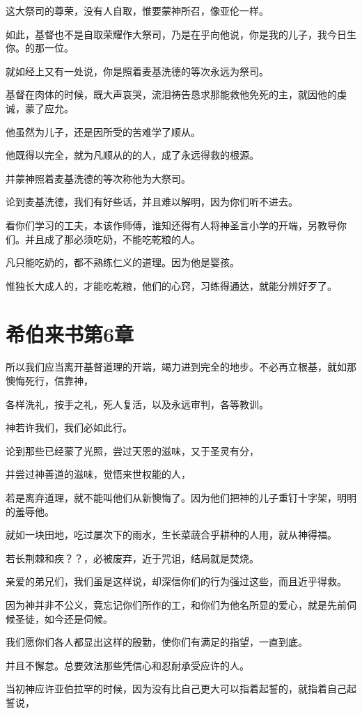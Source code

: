 \documentclass[12pt,oneside]{book}
\begin{document}
这大祭司的尊荣，没有人自取，惟要蒙神所召，像亚伦一样。

如此，基督也不是自取荣耀作大祭司，乃是在乎向他说，你是我的儿子，我今日生你。的那一位。

就如经上又有一处说，你是照着麦基洗德的等次永远为祭司。

基督在肉体的时候，既大声哀哭，流泪祷告恳求那能救他免死的主，就因他的虔诚，蒙了应允。

他虽然为儿子，还是因所受的苦难学了顺从。

他既得以完全，就为凡顺从的的人，成了永远得救的根源。

并蒙神照着麦基洗德的等次称他为大祭司。

论到麦基洗德，我们有好些话，并且难以解明，因为你们听不进去。

看你们学习的工夫，本该作师傅，谁知还得有人将神圣言小学的开端，另教导你们。并且成了那必须吃奶，不能吃乾粮的人。

凡只能吃奶的，都不熟练仁义的道理。因为他是婴孩。

惟独长大成人的，才能吃乾粮，他们的心窍，习练得通达，就能分辨好歹了。

\chapter{希伯来书第6章}
所以我们应当离开基督道理的开端，竭力进到完全的地步。不必再立根基，就如那懊悔死行，信靠神，

各样洗礼，按手之礼，死人复活，以及永远审判，各等教训。

神若许我们，我们必如此行。

论到那些已经蒙了光照，尝过天恩的滋味，又于圣灵有分，

并尝过神善道的滋味，觉悟来世权能的人，

若是离弃道理，就不能叫他们从新懊悔了。因为他们把神的儿子重钉十字架，明明的羞辱他。

就如一块田地，吃过屡次下的雨水，生长菜蔬合乎耕种的人用，就从神得福。

若长荆棘和疾？？，必被废弃，近于咒诅，结局就是焚烧。

亲爱的弟兄们，我们虽是这样说，却深信你们的行为强过这些，而且近乎得救。

因为神并非不公义，竟忘记你们所作的工，和你们为他名所显的爱心，就是先前伺候圣徒，如今还是伺候。

我们愿你们各人都显出这样的殷勤，使你们有满足的指望，一直到底。

并且不懈怠。总要效法那些凭信心和忍耐承受应许的人。

当初神应许亚伯拉罕的时候，因为没有比自己更大可以指着起誓的，就指着自己起誓说，
\end{document}

